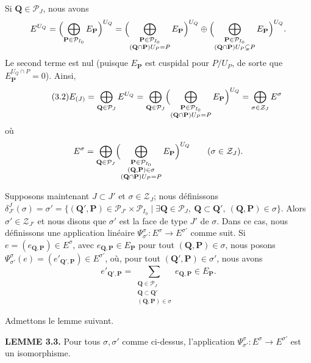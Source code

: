 \documentclass[10pt,a4paper]{article}
\theoremstyle{plain}
\theoremstyle{definition}
\theoremstyle{remark}
\newcommand{\cP}{\mathcal{P}}
\newcommand{\cZ}{\mathcal{Z}}
\newcommand{\bP}{\mathbf{P}}
\newcommand{\bQ}{\mathbf{Q}}
\begin{document}
Si $\bQ \in \cP_J$, nous avons
\begin{equation*}
E^{U_Q} = \Bigl(\bigoplus_{\bP \in \cP_{I_0}} E_{\bP}\Bigr)^{U_Q} = \Bigl(\bigoplus_{\substack{\bP \in \cP_{I_0} \\ (\bQ \cap \bP)U_P = P}} E_{\bP}\Bigr)^{U_Q} \oplus \Bigl(\bigoplus_{\substack{\bP \in \cP_{I_0} \\ (\bQ \cap \bP)U_P \subsetneq P}} E_{\bP}\Bigr)^{U_Q}.
\end{equation*}
Le second terme est nul (puisque $E_{\bP}$ est cuspidal pour $P/U_P$, de sorte que $E_{\bP}^{U_Q \cap P} = 0$). Ainsi,
\begin{equation}\tag{3.2}\label{eq:3.2}
E_{(J)} = \bigoplus_{\bQ \in \cP_J} E^{U_Q} = \bigoplus_{\bQ \in \cP_J} \Bigl(\bigoplus_{\substack{\bP \in \cP_{I_0} \\ (\bQ \cap \bP)U_P = P}} E_{\bP}\Bigr)^{U_Q} = \bigoplus_{\sigma \in \cZ_J} E^\sigma
\end{equation}
où
\begin{equation*}
E^\sigma = \bigoplus_{\bQ \in \cP_J} \Bigl(\bigoplus_{\substack{\bP \in \cP_{I_0} \\ (\bQ,\bP) \in \sigma \\ (\bQ \cap \bP)U_P = P}} E_{\bP}\Bigr)^{U_Q} \qquad (\sigma \in \cZ_J).
\end{equation*}

Supposons maintenant $J \subset J'$ et $\sigma \in \cZ_J$; nous définissons $\delta_{J'}^J(\sigma) = \sigma' = \{(\bQ',\bP) \in \cP_{J'} \times \cP_{I_0} \mid \exists \bQ \in \cP_J,\ \bQ \subset \bQ',\ (\bQ,\bP) \in \sigma\}$. Alors $\sigma' \in \cZ_{J'}$ et nous disons que $\sigma'$ est la face de type $J'$ de $\sigma$. Dans ce cas, nous définissons une application linéaire $\Psi_{\sigma'}^{\sigma} \colon E^\sigma \to E^{\sigma'}$ comme suit. Si $e = (e_{\bQ,\bP}) \in E^\sigma$, avec $e_{\bQ,\bP} \in E_{\bP}$ pour tout $(\bQ,\bP) \in \sigma$, nous posons $\Psi_{\sigma'}^{\sigma}(e) = (e'_{\bQ',\bP}) \in E^{\sigma'}$, où, pour tout $(\bQ',\bP) \in \sigma'$, nous avons
\begin{equation*}
e'_{\bQ',\bP} = \sum_{\substack{\bQ \in \cP_J \\ \bQ \subset \bQ' \\ (\bQ,\bP) \in \sigma}} e_{\bQ,\bP} \in E_{\bP}.
\end{equation*}

Admettons le lemme suivant.

\medskip\noindent\textbf{LEMME 3.3.}\quad
Pour tous $\sigma, \sigma'$ comme ci-dessus, l'application $\Psi_{\sigma'}^{\sigma} \colon E^\sigma \to E^{\sigma'}$ est un isomorphisme.
\end{document}
